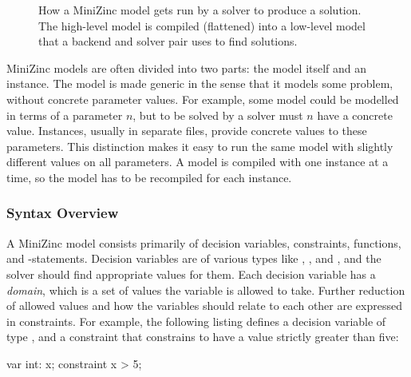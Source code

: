 \documentclass[a4paper,12pt]{article}
\begin{document}
\begin{figure}[t]
  \centering
  
  \caption{How a MiniZinc model gets run by a solver to produce a solution. The high-level
    model is compiled (flattened) into a low-level model that a backend and solver pair
    uses to find solutions.}%
  \label{fig:minizinc}
\end{figure}

MiniZinc models are often divided into two parts: the model itself and an instance. The
model is made generic in the sense that it models some problem, without concrete parameter values. For
example, some model could be modelled in terms of a parameter $n$, but to be solved by a
solver must $n$ have a concrete value. Instances, usually in separate files, provide
concrete values to these parameters. This distinction makes it easy to run the same model
with slightly different values on all parameters. A model is compiled with one instance at a time, so the model has to be
recompiled for each instance.

\subsubsection{Syntax Overview}\label{sec:mzn:syntax}
A MiniZinc model consists primarily of decision variables, constraints,
functions, and -statements. Decision variables are of various types like
, , and , and the solver should find appropriate values for them.
Each decision variable has a \emph{domain}, which is a set of values the variable is allowed to take.
Further reduction of allowed values and how the variables should relate to each other are expressed in
constraints. For example, the following listing defines a decision variable  of type
, and a constraint that constrains  to have a value strictly greater than
five:
\begin{mznnobreak}
var int: x;
constraint x > 5;
\end{mznnobreak}
\end{document}
